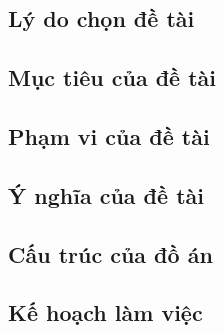 \subsection{Lý do chọn đề tài}

\subsection{Mục tiêu của đề tài}

\subsection{Phạm vi của đề tài}

\subsection{Ý nghĩa của đề tài}

\subsection{Cấu trúc của đồ án}

\subsection{Kế hoạch làm việc}

